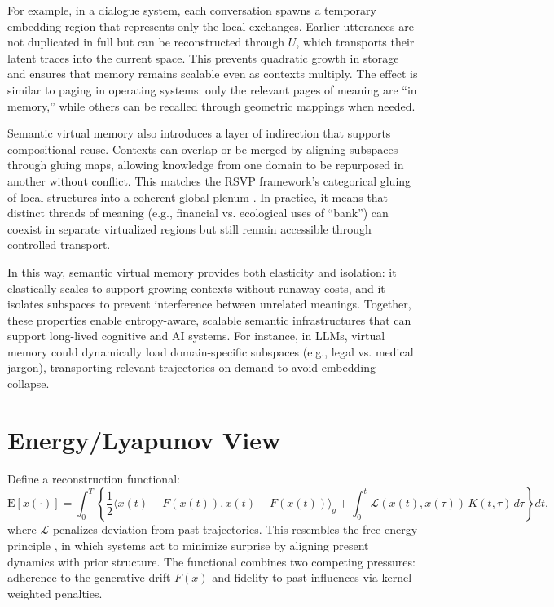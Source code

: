 \documentclass[a4paper,12pt]{article}
\newcommand{\E}{\mathrm{E}}
\begin{document}
For example, in a dialogue system, each conversation spawns a temporary embedding region that represents only the local exchanges. Earlier utterances are not duplicated in full but can be reconstructed through $U$, which transports their latent traces into the current space. This prevents quadratic growth in storage and ensures that memory remains scalable even as contexts multiply. The effect is similar to paging in operating systems: only the relevant pages of meaning are ``in memory,'' while others can be recalled through geometric mappings when needed.

Semantic virtual memory also introduces a layer of indirection that supports compositional reuse. Contexts can overlap or be merged by aligning subspaces through gluing maps, allowing knowledge from one domain to be repurposed in another without conflict. This matches the RSVP framework’s categorical gluing of local structures into a coherent global plenum \citep{semantic2025}. In practice, it means that distinct threads of meaning (e.g., financial vs. ecological uses of ``bank'') can coexist in separate virtualized regions but still remain accessible through controlled transport.

In this way, semantic virtual memory provides both elasticity and isolation: it elastically scales to support growing contexts without runaway costs, and it isolates subspaces to prevent interference between unrelated meanings. Together, these properties enable entropy-aware, scalable semantic infrastructures that can support long-lived cognitive and AI systems. For instance, in LLMs, virtual memory could dynamically load domain-specific subspaces (e.g., legal vs. medical jargon), transporting relevant trajectories on demand to avoid embedding collapse.

\section{Energy/Lyapunov View}
Define a reconstruction functional:
\[
\E[x(\cdot)] = \int_0^T \left\{ \frac{1}{2} \langle \dot{x}(t) - F(x(t)), \dot{x}(t) - F(x(t)) \rangle_g + \int_0^t \mathcal{L}(x(t), x(\tau)) \, K(t,\tau) \, d\tau \right\} dt,
\]
where $\mathcal{L}$ penalizes deviation from past trajectories. This resembles the free-energy principle \citep{friston2010free}, in which systems act to minimize surprise by aligning present dynamics with prior structure. The functional combines two competing pressures: adherence to the generative drift $F(x)$ and fidelity to past influences via kernel-weighted penalties. 
\end{document}
